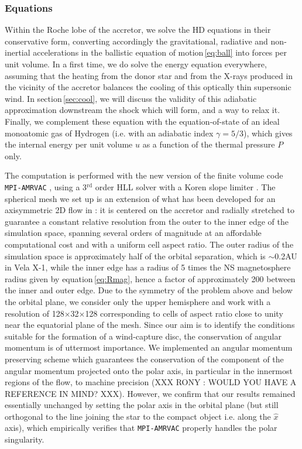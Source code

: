 \documentclass{aa}
\makeatletter
\newcommand*{\ns}{NS\@\xspace}
\newcommand*{\ie}{i.e.\@\xspace}
\makeatother
\begin{document}
\subsubsection{Equations}
\label{sec:HD_eq}

Within the Roche lobe of the accretor, we solve the HD equations in their conservative form, converting accordingly the gravitational, radiative and non-inertial accelerations in the ballistic equation of motion\,\eqref{eq:ball} into forces per unit volume. In a first time, we do solve the energy equation everywhere, assuming that the heating from the donor star and from the X-rays produced in the vicinity of the accretor balances the cooling of this optically thin supersonic wind. In section\,\ref{sec:cool}, we will discuss the validity of this adiabatic approximation downstream the shock which will form, and a way to relax it. Finally, we complement these equation with the equation-of-state of an ideal monoatomic gas of Hydrogen (\ie with an adiabatic index $\gamma=5/3$), which gives the internal energy per unit volume $u$ as a function of the thermal pressure $P$ only.

The computation is performed with the new version of the finite volume code \texttt{MPI-AMRVAC} \citep{Xia2017}, using a 3$^{\text{rd}}$ order HLL solver \citep{Toro1994} with a Koren slope limiter \citep{Vreugdenhil1993}. The spherical mesh we set up is an extension of what has been developed for an axisymmetric 2D flow in \cite{ElMellah2015} : it is centered on the accretor and radially stretched to guarantee a constant relative resolution from the outer to the inner edge of the simulation space, spanning several orders of magnitude at an affordable computational cost and with a uniform cell aspect ratio. The outer radius of the simulation space is approximately half of the orbital separation, which is $\sim$0.2AU in Vela X-1, while the inner edge has a radius of 5 times the \ns magnetosphere radius given by equation\,\eqref{eq:Rmag}, hence a factor of approximately 200 between the inner and outer edge. Due to the symmetry of the problem above and below the orbital plane, we consider only the upper hemisphere and work with a resolution of 128$\times$32$\times$128 corresponding to cells of aspect ratio close to unity near the equatorial plane of the mesh. Since our aim is to identify the conditions suitable for the formation of a wind-capture disc, the conservation of angular momentum is of uttermost importance. We implemented an angular momentum preserving scheme which guarantees the conservation of the component of the angular momentum projected onto the polar axis, in particular in the innermost regions of the flow, to machine precision (XXX RONY : WOULD YOU HAVE A REFERENCE IN MIND? XXX). However, we confirm that our results remained essentially unchanged by setting the polar axis in the orbital plane (but still orthogonal to the line joining the star to the compact object \ie along the $\hat{x}$ axis), which empirically verifies that \texttt{MPI-AMRVAC} properly handles the polar singularity.
\end{document}
